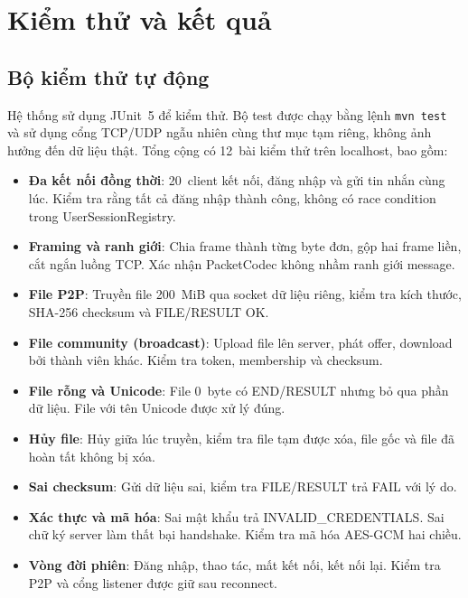 \section{Kiểm thử và kết quả}
\begingroup
\setlength{\emergencystretch}{2em}

\subsection{Bộ kiểm thử tự động}

Hệ thống sử dụng JUnit~5 để kiểm thử. Bộ test được chạy bằng lệnh \texttt{mvn test} và sử dụng cổng TCP/UDP ngẫu nhiên cùng thư mục tạm riêng, không ảnh hưởng đến dữ liệu thật. Tổng cộng có 12~bài kiểm thử trên localhost, bao gồm:

\begin{itemize}
\item \textbf{Đa kết nối đồng thời}: 20~client kết nối, đăng nhập và gửi tin nhắn cùng lúc. Kiểm tra rằng tất cả đăng nhập thành công, không có race condition trong UserSessionRegistry.

\item \textbf{Framing và ranh giới}: Chia frame thành từng byte đơn, gộp hai frame liền, cắt ngắn luồng TCP. Xác nhận PacketCodec không nhầm ranh giới message.

\item \textbf{File P2P}: Truyền file 200~MiB qua socket dữ liệu riêng, kiểm tra kích thước, SHA-256 checksum và FILE/RESULT OK.

\item \textbf{File community (broadcast)}: Upload file lên server, phát offer, download bởi thành viên khác. Kiểm tra token, membership và checksum.

\item \textbf{File rỗng và Unicode}: File 0~byte có END/RESULT nhưng bỏ qua phần dữ liệu. File với tên Unicode được xử lý đúng.

\item \textbf{Hủy file}: Hủy giữa lúc truyền, kiểm tra file tạm được xóa, file gốc và file đã hoàn tất không bị xóa.

\item \textbf{Sai checksum}: Gửi dữ liệu sai, kiểm tra FILE/RESULT trả FAIL với lý do.

\item \textbf{Xác thực và mã hóa}: Sai mật khẩu trả INVALID\_CREDENTIALS. Sai chữ ký server làm thất bại handshake. Kiểm tra mã hóa AES-GCM hai chiều.

\item \textbf{Vòng đời phiên}: Đăng nhập, thao tác, mất kết nối, kết nối lại. Kiểm tra P2P và cổng listener được giữ sau reconnect.
\end{itemize}

